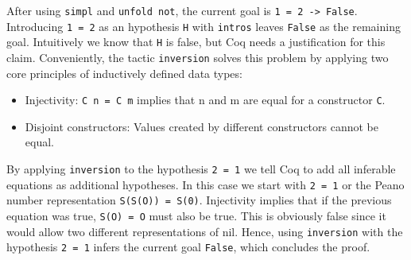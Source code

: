 \documentclass[paper = a4, fleqn, abstract=on, twoside]{scrreprt}
\newcommand{\coqinline}[1]{\texttt{#1}}
\begin{document}
After using \coqinline{simpl} and \coqinline{unfold not}, the current goal is \coqinline{1 = 2 -> False}. Introducing \coqinline{1 = 2} as an hypothesis \coqinline{H} with \coqinline{intros} leaves \coqinline{False} as the remaining goal. Intuitively we know that \coqinline{H} is false, but Coq needs a justification for this claim.
Conveniently, the tactic \coqinline{inversion} solves this problem by applying two core principles of inductively defined data types:
\begin{itemize}
	\item Injectivity: \coqinline{C n = C m} implies that n and m are equal for a constructor \coqinline{C}.
	\item Disjoint constructors: Values created by different constructors cannot be equal.
\end{itemize}
By applying \coqinline{inversion} to the hypothesis \coqinline{2 = 1} we tell Coq to add all inferable equations as additional hypotheses. In this case we start with \coqinline{2 = 1} or the Peano number representation \coqinline{S(S(O)) = S(0)}. Injectivity implies that if the previous equation was true, \coqinline{S(O) = O} must also be true. This is obviously false since it would allow two different representations of nil. Hence, using \coqinline{inversion} with the hypothesis \coqinline{2 = 1} infers the current goal \coqinline{False}, which concludes the proof.
\end{document}

